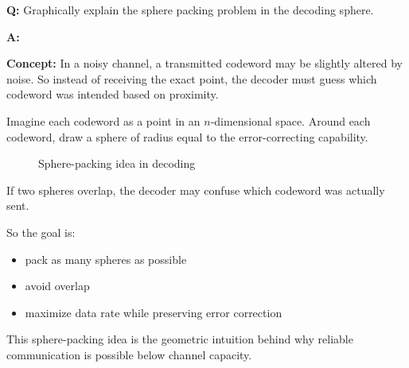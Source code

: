 \documentclass[11pt,a4paper]{book}
\newcounter{qna}[chapter]
\renewcommand{\theqna}{\thechapter.\arabic{qna}}
\newenvironment{questionanswerbox}[1][Example]{%
    \refstepcounter{qna}
    \begin{tcolorbox}[
        enhanced,
        breakable,
        colback=softlavender!10,
        colframe=softlavender!200,
        title={#1~\theqna},
        fonttitle=\bfseries,
        coltitle=white,
        colbacktitle=softlavender!200,
        sharp corners,
        boxrule=1pt,
        left=8pt,
        right=8pt,
        top=6pt,
        bottom=6pt
    ]
}{\end{tcolorbox}}
\begin{document}
\begin{questionanswerbox}[Sphere Packing Problem in Decoding Example]
\textbf{Q:} Graphically explain the sphere packing problem in the decoding sphere.

\textbf{A:}

\textbf{Concept:}
In a noisy channel, a transmitted codeword may be slightly altered by noise. So instead of receiving the exact point, the decoder must guess which codeword was intended based on proximity.

Imagine each codeword as a point in an \(n\)-dimensional space. Around each codeword, draw a sphere of radius equal to the error-correcting capability.

\begin{figure}[H]
    \centering
    \caption{Sphere-packing idea in decoding}
\end{figure}

If two spheres overlap, the decoder may confuse which codeword was actually sent.

So the goal is:
\begin{itemize}
    \item pack as many spheres as possible
    \item avoid overlap
    \item maximize data rate while preserving error correction
\end{itemize}

This sphere-packing idea is the geometric intuition behind why reliable communication is possible below channel capacity.
\end{questionanswerbox}
\end{document}
